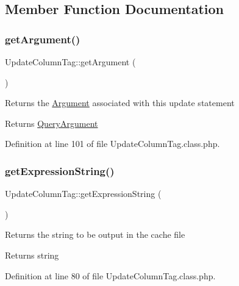 \subsection{Member Function Documentation}
\mbox{\label{classUpdateColumnTag_a6b6cca5c598d435f3f40caf96f5dea4a}} 
\subsubsection{\texorpdfstring{get\+Argument()}{getArgument()}}
{\footnotesize\ttfamily Update\+Column\+Tag\+::get\+Argument (\begin{DoxyParamCaption}{ }\end{DoxyParamCaption})}

Returns the \hyperlink{classArgument}{Argument} associated with this update statement

\begin{DoxyReturn}{Returns}
\hyperlink{classQueryArgument}{Query\+Argument} 
\end{DoxyReturn}


Definition at line 101 of file Update\+Column\+Tag.\+class.\+php.

\mbox{\label{classUpdateColumnTag_a16ab982f05143f8e0c4550f02ebe2357}} 
\subsubsection{\texorpdfstring{get\+Expression\+String()}{getExpressionString()}}
{\footnotesize\ttfamily Update\+Column\+Tag\+::get\+Expression\+String (\begin{DoxyParamCaption}{ }\end{DoxyParamCaption})}

Returns the string to be output in the cache file

\begin{DoxyReturn}{Returns}
string 
\end{DoxyReturn}


Definition at line 80 of file Update\+Column\+Tag.\+class.\+php.

